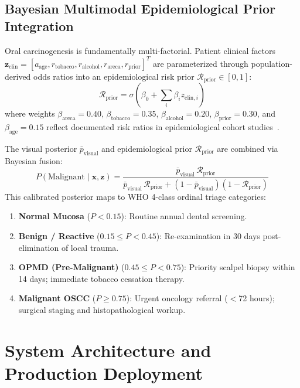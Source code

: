\documentclass[journal]{IEEEtran}
\begin{document}
\subsection{Bayesian Multimodal Epidemiological Prior Integration}
Oral carcinogenesis is fundamentally multi-factorial. Patient clinical factors $\mathbf{z}_{\text{clin}} = [a_{\text{age}}, r_{\text{tobacco}}, r_{\text{alcohol}}, r_{\text{areca}}, r_{\text{prior}}]^T$ are parameterized through population-derived odds ratios into an epidemiological risk prior $\mathcal{R}_{\text{prior}} \in [0, 1]$:
\begin{equation}
\mathcal{R}_{\text{prior}} = \sigma\left( \beta_0 + \sum_{i} \beta_i z_{\text{clin}, i} \right)
\end{equation}
where weights $\beta_{\text{areca}} = 0.40$, $\beta_{\text{tobacco}} = 0.35$, $\beta_{\text{alcohol}} = 0.20$, $\beta_{\text{prior}} = 0.30$, and $\beta_{\text{age}} = 0.15$ reflect documented risk ratios in epidemiological cohort studies~\cite{gupta2004epidemiology}.

The visual posterior $\bar{p}_{\text{visual}}$ and epidemiological prior $\mathcal{R}_{\text{prior}}$ are combined via Bayesian fusion:
\begin{equation}
P(\text{Malignant} \mid \mathbf{x}, \mathbf{z}) = \frac{\bar{p}_{\text{visual}} \, \mathcal{R}_{\text{prior}}}{\bar{p}_{\text{visual}} \, \mathcal{R}_{\text{prior}} + (1 - \bar{p}_{\text{visual}})(1 - \mathcal{R}_{\text{prior}})}
\label{eq:bayes}
\end{equation}
This calibrated posterior maps to WHO 4-class ordinal triage categories:
\begin{enumerate}
    \item \textbf{Normal Mucosa} ($P < 0.15$): Routine annual dental screening.
    \item \textbf{Benign / Reactive} ($0.15 \le P < 0.45$): Re-examination in 30 days post-elimination of local trauma.
    \item \textbf{OPMD (Pre-Malignant)} ($0.45 \le P < 0.75$): Priority scalpel biopsy within 14 days; immediate tobacco cessation therapy.
    \item \textbf{Malignant OSCC} ($P \ge 0.75$): Urgent oncology referral ($<$72 hours); surgical staging and histopathological workup.
\end{enumerate}

\section{System Architecture and Production Deployment}
\end{document}
